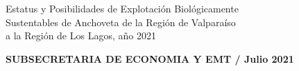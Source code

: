 \documentclass[12pt, oneside]{article} %
\begin{document}
\begin{titlepage}
\begin{minipage}{\textwidth}
{            \centering \fontsize{9pt}{8pt}\selectfont
            \vspace*{-5mm} 
            \hfill \begin{flushright}
            Estatus y Posibilidades de Explotación Biológicamente \\ Sustentables de Anchoveta de la  Región de Valparaíso \\ a la Región de Los Lagos, año 2021
			\end{flushright} 
              
			\centering \fontsize{10pt}{8pt}\selectfont
            \vspace*{2mm} 
            \hfill \textbf{SUBSECRETARIA DE ECONOMIA Y EMT / Julio 2021}
                        
            \vspace*{0.2cm}
        }
    \end{minipage}

\end{titlepage}
\endgroup
\end{document}
